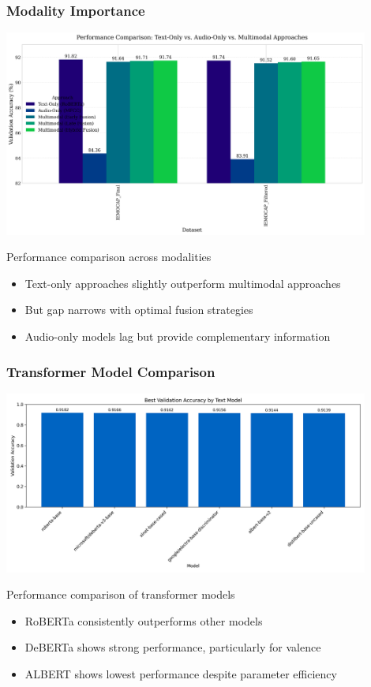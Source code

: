 \documentclass{beamer}
\begin{document}
\begin{frame}
\frametitle{Modality Importance}
\begin{center}
\includegraphics[width=0.9\textwidth]{figures/modality_comparison.png}
\caption{Performance comparison across modalities}
\end{center}

\begin{itemize}
    \item Text-only approaches slightly outperform multimodal approaches
    \item But gap narrows with optimal fusion strategies
    \item Audio-only models lag but provide complementary information
\end{itemize}
\end{frame}

\begin{frame}
\frametitle{Transformer Model Comparison}
\begin{center}
\includegraphics[width=0.9\textwidth]{figures/text_model_comparison.png}
\caption{Performance comparison of transformer models}
\end{center}

\begin{itemize}
    \item RoBERTa consistently outperforms other models
    \item DeBERTa shows strong performance, particularly for valence
    \item ALBERT shows lowest performance despite parameter efficiency
\end{itemize}
\end{frame}
\end{document}
